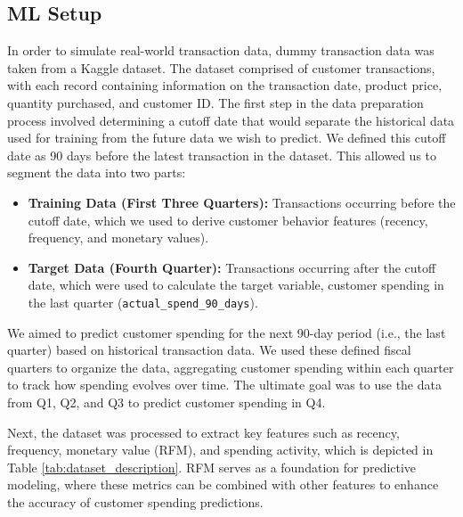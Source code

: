 \documentclass{scrartcl}
\begin{document}
\subsection{ML Setup}

In order to simulate real-world transaction data, dummy transaction data was taken from a Kaggle dataset\cite{rehman2023retail}. The dataset comprised of customer transactions, with each record containing information on the transaction date, product price, quantity purchased, and customer ID. The first step in the data preparation process involved determining a cutoff date that would separate the historical data used for training from the future data we wish to predict. We defined this cutoff date as 90 days before the latest transaction in the dataset. This allowed us to segment the data into two parts:

\begin{itemize}
	\item \textbf{Training Data (First Three Quarters):} Transactions occurring before the cutoff date, which we used to derive customer behavior features (recency, frequency, and monetary values).
	\item \textbf{Target Data (Fourth Quarter):} Transactions occurring after the cutoff date, which were used to calculate the target variable, customer spending in the last quarter (\texttt{actual\_spend\_90\_days}).
\end{itemize}

We aimed to predict customer spending for the next 90-day period (i.e., the last quarter) based on historical transaction data. We used these defined fiscal quarters to organize the data, aggregating customer spending within each quarter to track how spending evolves over time. The ultimate goal was to use the data from Q1, Q2, and Q3 to predict customer spending in Q4.

Next, the dataset was processed to extract key features such as recency, frequency, monetary value (RFM), and spending activity, which is depicted in Table \ref{tab:dataset_description}. RFM serves as a foundation for predictive modeling, where these metrics can be combined with other features to enhance the accuracy of customer spending predictions.
\end{document}
